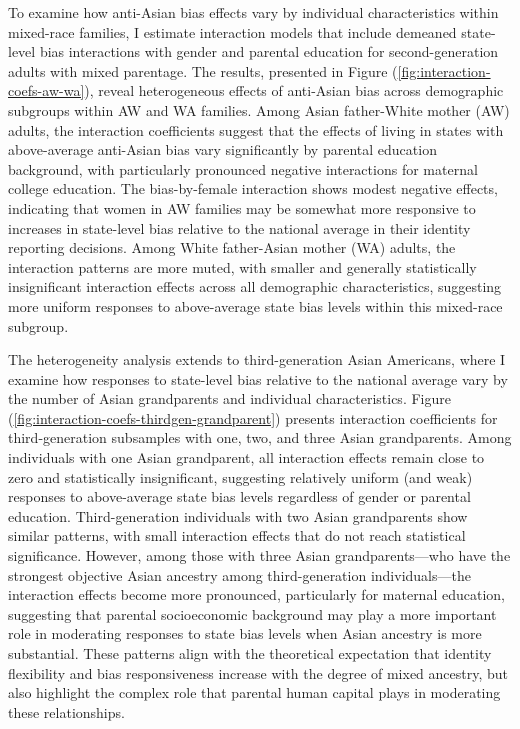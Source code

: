 To examine how anti-Asian bias effects vary by individual characteristics within mixed-race families, I estimate interaction models that include demeaned state-level bias interactions with gender and parental education for second-generation adults with mixed parentage. The results, presented in Figure (\ref{fig:interaction-coefs-aw-wa}), reveal heterogeneous effects of anti-Asian bias across demographic subgroups within AW and WA families. Among Asian father-White mother (AW) adults, the interaction coefficients suggest that the effects of living in states with above-average anti-Asian bias vary significantly by parental education background, with particularly pronounced negative interactions for maternal college education. The bias-by-female interaction shows modest negative effects, indicating that women in AW families may be somewhat more responsive to increases in state-level bias relative to the national average in their identity reporting decisions. Among White father-Asian mother (WA) adults, the interaction patterns are more muted, with smaller and generally statistically insignificant interaction effects across all demographic characteristics, suggesting more uniform responses to above-average state bias levels within this mixed-race subgroup.

The heterogeneity analysis extends to third-generation Asian Americans, where I examine how responses to state-level bias relative to the national average vary by the number of Asian grandparents and individual characteristics. Figure (\ref{fig:interaction-coefs-thirdgen-grandparent}) presents interaction coefficients for third-generation subsamples with one, two, and three Asian grandparents. Among individuals with one Asian grandparent, all interaction effects remain close to zero and statistically insignificant, suggesting relatively uniform (and weak) responses to above-average state bias levels regardless of gender or parental education. Third-generation individuals with two Asian grandparents show similar patterns, with small interaction effects that do not reach statistical significance. However, among those with three Asian grandparents—who have the strongest objective Asian ancestry among third-generation individuals—the interaction effects become more pronounced, particularly for maternal education, suggesting that parental socioeconomic background may play a more important role in moderating responses to state bias levels when Asian ancestry is more substantial. These patterns align with the theoretical expectation that identity flexibility and bias responsiveness increase with the degree of mixed ancestry, but also highlight the complex role that parental human capital plays in moderating these relationships.

